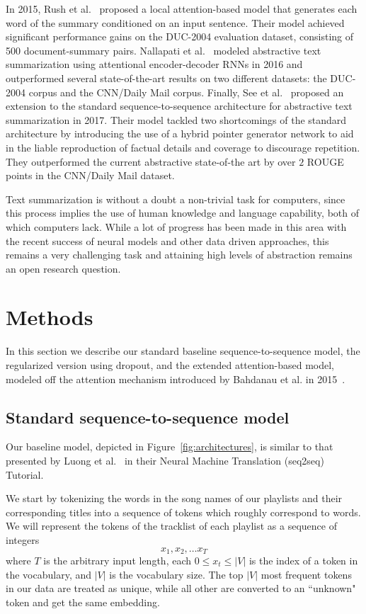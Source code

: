 \documentclass{article} %
\begin{document}
In 2015, Rush et al.~\cite{rush2015neural} proposed a local attention-based model that generates each word of the summary conditioned on an input sentence. 
Their model achieved significant performance gains on the DUC-2004 evaluation dataset, consisting of 500 document-summary pairs.   
Nallapati et al.~\cite{nallapati2016abstractive} modeled abstractive text summarization using attentional encoder-decoder RNNs in 2016 and outperformed several state-of-the-art results on two different datasets: the DUC-2004 corpus and the CNN/Daily Mail corpus.
Finally, See et al.~\cite{see2017get} proposed an extension to the standard sequence-to-sequence architecture for abstractive text summarization in 2017.
Their model tackled two shortcomings of the standard architecture by introducing the use of a hybrid pointer generator network to aid in the liable reproduction of factual details and coverage to discourage repetition. 
They outperformed the current abstractive state-of-the art by over $2$ ROUGE points in the CNN/Daily Mail dataset.

Text summarization is without a doubt a non-trivial task for computers, since this process implies the use of human knowledge and language capability, both of which computers lack. 
While a lot of progress has been made in this area with the recent success of neural models and other data driven approaches, this remains a very challenging task and attaining high levels of abstraction remains an open research question. 
 
\section{Methods}
\label{sec:app}
In this section we describe our standard baseline sequence-to-sequence model, the regularized version using dropout, and the extended attention-based model, modeled off the attention mechanism introduced by Bahdanau et al. in 2015~\cite{bahdanau2014neural}. 

\subsection{Standard sequence-to-sequence model}
\label{sec:seq2seq}

Our baseline model, depicted in Figure~\ref{fig:architectures}, is similar to that presented by Luong et al.~\cite{luong17} in their Neural Machine Translation (seq2seq) Tutorial.

We start by tokenizing the words in the song names of our playlists and their corresponding titles into a sequence of tokens which roughly correspond to words.
We will represent the tokens of the tracklist of each playlist as a sequence of integers
\[
x_1, x_2, \dots x_T
\]
where $T$ is the arbitrary input length, each $0 \le x_t \le |V|$ is the index of a token in the vocabulary, and $|V|$ is the vocabulary size. 
The top $|V|$ most frequent tokens in our data are treated as unique, while all other are converted to an ``unknown" token and get the same embedding. 
\end{document}

